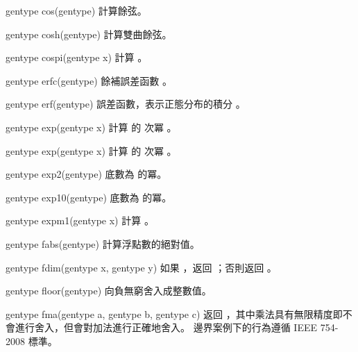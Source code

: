 gentype cos(gentype)
\stopbuffer
{}
計算餘弦。
\stopbuffer

gentype cosh(gentype)
\stopbuffer
{}
計算雙曲餘弦。
\stopbuffer

gentype cospi(gentype x)
\stopbuffer
{}
計算 。
\stopbuffer

gentype erfc(gentype)
\stopbuffer
{}
餘補誤差函數
 。
\stopbuffer

gentype erf(gentype)
\stopbuffer
{}
誤差函數，表示正態分布的積分
 。
\stopbuffer

gentype exp(gentype x)
\stopbuffer
{}
計算  的  次冪 。
\stopbuffer

gentype exp(gentype x)
\stopbuffer
{}
計算  的  次冪 。
\stopbuffer

gentype exp2(gentype)
\stopbuffer
{}
底數為  的冪。
\stopbuffer

gentype exp10(gentype)
\stopbuffer
{}
底數為  的冪。
\stopbuffer

gentype expm1(gentype x)
\stopbuffer
{}
計算 。
\stopbuffer

gentype fabs(gentype)
\stopbuffer
{}
計算浮點數的絕對值。
\stopbuffer

gentype fdim(gentype x,
	     gentype y)
\stopbuffer
{}
如果 ，返回 ；否則返回 。
\stopbuffer

gentype floor(gentype)
\stopbuffer
{}
向負無窮舍入成整數值。
\stopbuffer

gentype fma(gentype a,
	    gentype b,
	    gentype c)
\stopbuffer
{}
返回 ，其中乘法具有無限精度即不會進行舍入，但會對加法進行正確地舍入。
邊界案例下的行為遵循 IEEE 754-2008 標準。
\stopbuffer

